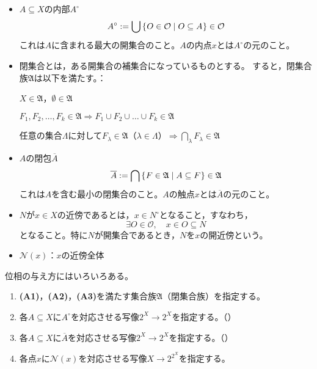 \documentclass[uplatex]{jsarticle}
\begin{document}
\begin{itemize}
  \vspace{-0.5\baselineskip}
  \item $A \subseteq X$の内部$A^{\circ}$
  \begin{equation}
    A^{\circ} := \bigcup \Set{\hspace{-1.8pt} O \in \mathcal{O} | O \subseteq A \hspace{-1.8pt}} \in \mathcal{O}
  \end{equation}
  これは$A$に含まれる最大の開集合のこと。$A$の内点$x$とは$A^{\circ}$の元のこと。
  \item 閉集合とは，ある開集合の補集合になっているものとする。
  すると，閉集合族$\mathfrak{A}$は以下を満たす。：

   $X \in \mathfrak{A}$，$\emptyset \in \mathfrak{A}$

   $F_{1}, F_{2}, \dots, F_{k} \in \mathfrak{A} \Longrightarrow F_{1} \cup F_{2} \cup \dots \cup F_{k} \in \mathfrak{A}$

   任意の集合$\Lambda$に対して$F_{\lambda} \in \mathfrak{A} $（$\lambda \in \Lambda$）$\Longrightarrow {\displaystyle \bigcap_{\lambda} F_{\lambda} \in \mathfrak{A}}$

  \item $A$の閉包$\overline{A}$
  \begin{equation}
    \overline{A} := \bigcap \Set{\hspace{-1.8pt} F \in \mathfrak{A} | A \subseteq F \hspace{-1.8pt}} \in \mathfrak{A}
  \end{equation}
  これは$A$を含む最小の閉集合のこと。$A$の触点$x$とは$\overline{A}$の元のこと。
  \item $N$が$x \in X$の近傍であるとは，$x \in N^{\circ}$となること，すなわち，
  \begin{equation}
    \exists O \in \mathcal{O}, \quad x \in O \subseteq N
  \end{equation}
  となること。特に$N$が開集合であるとき，$N$を$x$の開近傍という。
  \item $\mathcal{N}(x)$：$x$の近傍全体
  \vspace{-0.5\baselineskip}
\end{itemize}

位相の与え方にはいろいろある。

\begin{enumerate}
  \item {\bf (A1)}，{\bf (A2)}，{\bf (A3)}を満たす集合族$\mathfrak{A}$（閉集合族）を指定する。
  \item 各$A \subseteq X$に$A^{\circ}$を対応させる写像$2^{X} \longrightarrow 2^{X}$を指定する。（）
  \item 各$A \subseteq X$に$\overline{A}$を対応させる写像$2^{X} \longrightarrow 2^{X}$を指定する。（）
  \item 各点$x$に$\mathcal{N}(x)$を対応させる写像$X \longrightarrow 2^{2^{X}}$を指定する。
\end{enumerate}
\end{document}
